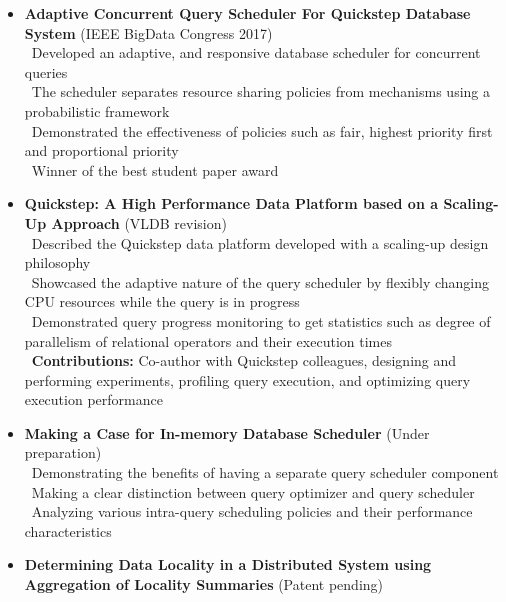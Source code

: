 \documentclass[11pt]{article}
\begin{document}
\begin{itemize}\addtolength{\itemsep}{-0.5\baselineskip}
\item{\textbf{Adaptive Concurrent Query Scheduler For Quickstep Database System} (IEEE BigData Congress 2017)}\\
		\textendash\ Developed an adaptive, and responsive database scheduler for concurrent queries\\
		\textendash\ The scheduler separates resource sharing policies from mechanisms using a probabilistic framework \\
		\textendash\ Demonstrated the effectiveness of policies such as fair, highest priority first and proportional priority\\
		\textendash\ Winner of the best student paper award\\
		
\item{\textbf{Quickstep: A High Performance Data Platform based
on a Scaling-Up Approach} (VLDB revision)}	\\
		\textendash\ Described the Quickstep data platform developed with a scaling-up design philosophy\\
		\textendash\ Showcased the adaptive nature of the query scheduler by flexibly changing CPU resources while the query is in progress \\
		\textendash\ Demonstrated query progress monitoring to get statistics such as degree of parallelism of relational operators and their execution times\\
		\textendash\ \textbf{Contributions:} Co-author with Quickstep colleagues, designing and performing experiments, profiling query execution, and optimizing query execution performance\\
		
\item{\textbf{Making a Case for In-memory Database Scheduler} (Under preparation)}	\\
		\textendash\ Demonstrating the benefits of having a separate query scheduler component\\
		\textendash\ Making a clear distinction between query optimizer and query scheduler\\ 
		\textendash\ Analyzing various intra-query scheduling policies and their performance characteristics\\	

\item{\textbf{Determining Data Locality in a Distributed System using Aggregation of Locality Summaries}
	(Patent pending)}	
\end{itemize}
\end{document}
